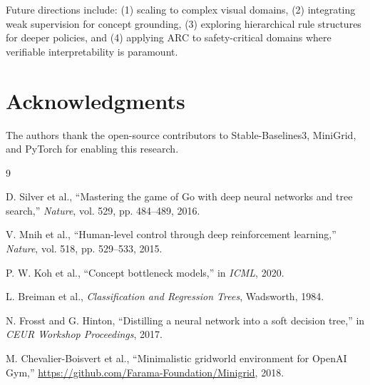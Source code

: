 \documentclass[11pt,twocolumn]{article}
\begin{document}
Future directions include: (1) scaling to complex visual domains, (2) integrating weak supervision for concept grounding, (3) exploring hierarchical rule structures for deeper policies, and (4) applying ARC to safety-critical domains where verifiable interpretability is paramount.

\section*{Acknowledgments}
The authors thank the open-source contributors to Stable-Baselines3, MiniGrid, and PyTorch for enabling this research.

\begin{thebibliography}{9}

D. Silver et al., ``Mastering the game of Go with deep neural networks and tree search,'' \emph{Nature}, vol. 529, pp. 484--489, 2016.

V. Mnih et al., ``Human-level control through deep reinforcement learning,'' \emph{Nature}, vol. 518, pp. 529--533, 2015.

P. W. Koh et al., ``Concept bottleneck models,'' in \emph{ICML}, 2020.

L. Breiman et al., \emph{Classification and Regression Trees}, Wadsworth, 1984.

N. Frosst and G. Hinton, ``Distilling a neural network into a soft decision tree,'' in \emph{CEUR Workshop Proceedings}, 2017.

M. Chevalier-Boisvert et al., ``Minimalistic gridworld environment for OpenAI Gym,'' \url{https://github.com/Farama-Foundation/Minigrid}, 2018.

\end{thebibliography}
\end{document}
